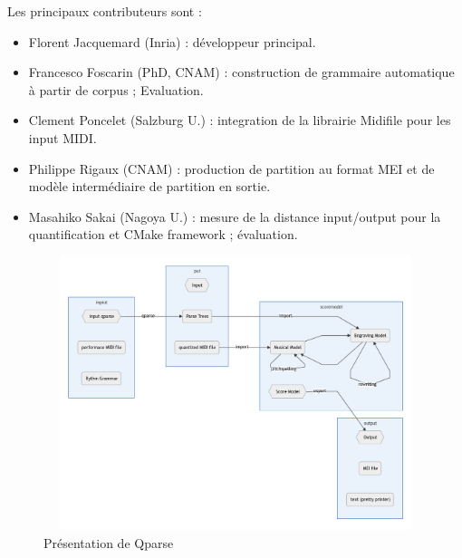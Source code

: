 Les principaux contributeurs sont :
\begin{itemize}
	\item Florent Jacquemard (Inria) : développeur principal.
	\item Francesco Foscarin (PhD, CNAM) :  construction de grammaire automatique 
	à partir de corpus ; Evaluation.
	\item Clement Poncelet (Salzburg U.) : integration de la librairie Midifile pour les input MIDI.
	\item Philippe Rigaux (CNAM) : production de partition au format MEI et de modèle intermédiaire de partition en sortie.
	\item Masahiko Sakai (Nagoya U.) : mesure de la distance input/output pour la quantification et CMake framework ; évaluation.
\end{itemize}

\begin{figure}[h]
	\centering
	\includegraphics[height=80mm, width=130mm]{z_images/3_methodes/1_qparse/0_general_qparse.png}
	\caption{Présentation de Qparse}
	\label{presentation_qparse}
\end{figure}

